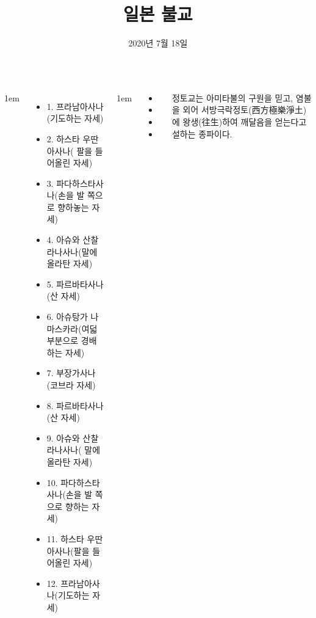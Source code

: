 \documentclass[25pt, a1paper ]{tikzposter}
\title{ 일본 불교 }
\author{ 2020년 7월  18일 }
\begin{document}
	\maketitle

	\begin{columns}


			{
					\setlength{\leftmargini}{2em}
					\setlength{\labelsep} {1em}
					\begin{itemize}
					\item 1. 프라남아사나(기도하는 자세) 
					\item 2. 하스타 우딴아사나( 팔을 들어올린 자세)
					\item 3. 파다하스타사나(손을 발 쪽으로 향하놓는 자세)
					\item 4. 아슈와 산찰라나사나(말에 올라탄 자세)
					\item 5. 파르바타사나(산 자세)
					\item 6. 아슈탕가 나마스카라(여덟 부분으로 경배하는 자세)
					\item 7. 부장가사나(코브라 자세)
					\item 8. 파르바타사나(산 자세)
					\item 9. 아슈와 산찰라나사나( 말에 올라탄 자세)
					\item 10. 파다하스타사나(손을 발 쪽으로 향하는 자세)
					\item 11. 하스타 우딴아사나(팔을 들어올린 자세)
					\item 12. 프라남아사나(기도하는 자세)
					\end{itemize}
			}

			{
					\setlength{\leftmargini}{3em}
					\setlength{\labelsep} {1em}
				\begin{LARGE}
					\begin{itemize}
					\item 
					\item 
					\item 
					\item 
					\end{itemize}
				\end{LARGE}
			}



		{
			정토교는 아미타불의 구원을 믿고, 
				염불을 외어 서방극락정토(西方極樂淨土)에 왕생(往生)하여 깨달음을 얻는다고 설하는 종파이다.
		}		




\end{columns}
\end{document}

